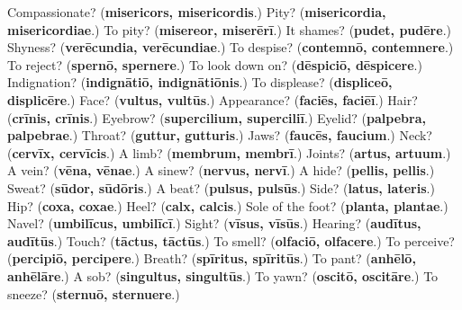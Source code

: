 \begin{tcolorbox}[breakable,colback=teal!4,colframe=teal!35!black,title={Before you move on}]
Compassionate? (\textbf{misericors, misericordis}.) Pity? (\textbf{misericordia, misericordiae}.) To pity? (\textbf{misereor, miserērī}.) It shames? (\textbf{pudet, pudēre}.) Shyness? (\textbf{verēcundia, verēcundiae}.) To despise? (\textbf{contemnō, contemnere}.) To reject? (\textbf{spernō, spernere}.) To look down on? (\textbf{dēspiciō, dēspicere}.) Indignation? (\textbf{indignātiō, indignātiōnis}.) To displease? (\textbf{displiceō, displicēre}.) Face? (\textbf{vultus, vultūs}.) Appearance? (\textbf{faciēs, faciēī}.) Hair? (\textbf{crīnis, crīnis}.) Eyebrow? (\textbf{supercilium, superciliī}.) Eyelid? (\textbf{palpebra, palpebrae}.) Throat? (\textbf{guttur, gutturis}.) Jaws? (\textbf{faucēs, faucium}.) Neck? (\textbf{cervīx, cervīcis}.) A limb? (\textbf{membrum, membrī}.) Joints? (\textbf{artus, artuum}.) A vein? (\textbf{vēna, vēnae}.) A sinew? (\textbf{nervus, nervī}.) A hide? (\textbf{pellis, pellis}.) Sweat? (\textbf{sūdor, sūdōris}.) A beat? (\textbf{pulsus, pulsūs}.) Side? (\textbf{latus, lateris}.) Hip? (\textbf{coxa, coxae}.) Heel? (\textbf{calx, calcis}.) Sole of the foot? (\textbf{planta, plantae}.) Navel? (\textbf{umbilīcus, umbilīcī}.) Sight? (\textbf{vīsus, vīsūs}.) Hearing? (\textbf{audītus, audītūs}.) Touch? (\textbf{tāctus, tāctūs}.) To smell? (\textbf{olfaciō, olfacere}.) To perceive? (\textbf{percipiō, percipere}.) Breath? (\textbf{spīritus, spīritūs}.) To pant? (\textbf{anhēlō, anhēlāre}.) A sob? (\textbf{singultus, singultūs}.) To yawn? (\textbf{oscitō, oscitāre}.) To sneeze? (\textbf{sternuō, sternuere}.)
\end{tcolorbox}
